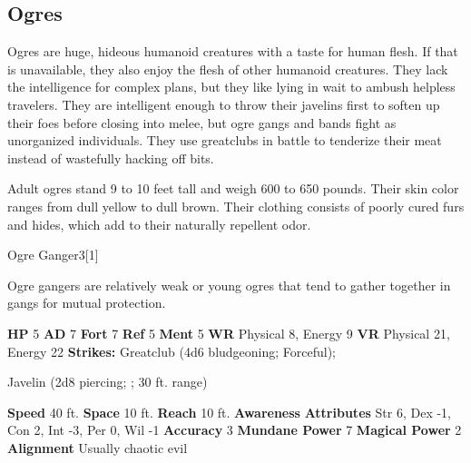     \subsection{Ogres}
      
    Ogres are huge, hideous humanoid creatures with a taste for human flesh.
    If that is unavailable, they also enjoy the flesh of other humanoid creatures.
    They lack the intelligence for complex plans, but they like lying in wait to ambush helpless travelers.
    They are intelligent enough to throw their javelins first to soften up their foes before closing into melee, but ogre gangs and bands fight as unorganized individuals.
    They use greatclubs in battle to tenderize their meat instead of wastefully hacking off bits.

    Adult ogres stand 9 to 10 feet tall and weigh 600 to 650 pounds.
    Their skin color ranges from dull yellow to dull brown.
    Their clothing consists of poorly cured furs and hides, which add to their naturally repellent odor.
  

      

      
  \begin{monsubsection}{Ogre Ganger}{3}[1]
    \vspace{-1em}\vspace{-1em}
    \vspace{0em}

    
        Ogre gangers are relatively weak or young ogres that tend to gather together in gangs for mutual protection.
      
    

    \begin{spellcontent}
      \begin{spelltargetinginfo}
        \pari \textbf{HP} 5 \monsep
          \textbf{AD} 7 \monsep
          \textbf{Fort} 7 \monsep
          \textbf{Ref} 5 \monsep
          \textbf{Ment} 5
        \pari \textbf{WR} Physical 8, Energy 9 \monsep
        \textbf{VR} Physical 21, Energy 22
        \pari \textbf{Strikes:}
            Greatclub  (4d6 bludgeoning; Forceful);
\par Javelin  (2d8 piercing; ; 30 ft. range)
      \end{spelltargetinginfo}
    \end{spellcontent}
    \begin{monsterfooter}
      \pari \textbf{Speed} 40 ft. \monsep
        \textbf{Space} 10 ft. \monsep
        \textbf{Reach} 10 ft.
      \pari \textbf{Awareness} 
      \pari \textbf{Attributes}
        Str 6, Dex -1,
        Con 2, Int -3,
        Per 0, Wil -1
      \pari \textbf{Accuracy} 3 \monsep
        \textbf{Mundane Power} 7 \monsep
      \textbf{Magical Power} 2
      \pari \textbf{Alignment} Usually chaotic evil
    \end{monsterfooter}
  \end{monsubsection}
  
